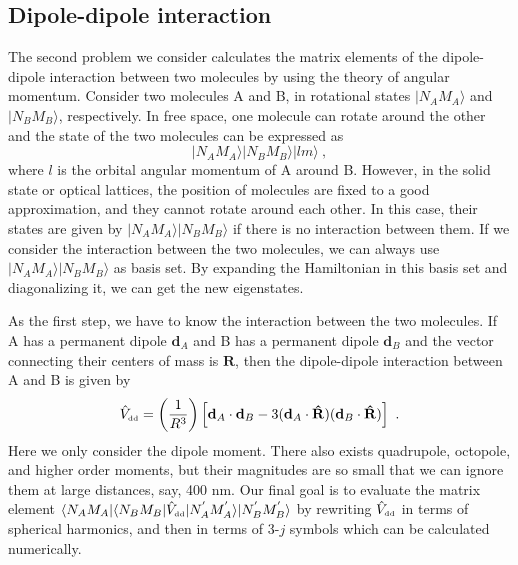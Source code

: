\subsection{Dipole-dipole interaction}
\label{sec::ddInteraction}

The second problem we consider calculates the matrix elements of the dipole-dipole interaction between two molecules by using the theory of angular momentum. 
Consider two molecules A and B, in rotational states $|N_{A}M_{A}\rangle$ and $|N_{B}M_{B}\rangle$, 
respectively. In free space, one molecule can rotate around the other and the state of the two molecules
can be expressed as
\begin{equation}
|N_{A}M_{A}\rangle |N_{B}M_{B}\rangle |lm\rangle  \ , \nonumber
\end{equation}
where $l$ is the orbital angular momentum  of A around B. 
However, in the solid state or optical lattices, the position of molecules are fixed to a good approximation, and they cannot rotate 
around each other. In this case, their states are given by $|N_{A}M_{A}\rangle |N_{B}M_{B}\rangle$ if there is no 
interaction between them. If we consider the interaction between the two molecules, we can always use $|N_{A}M_{A}\rangle |N_{B}M_{B}\rangle$ as basis set. By expanding the Hamiltonian in this basis set and diagonalizing 
it, we can get the new eigenstates.

As the first step, we have to know  the interaction between the two molecules. If A has a permanent dipole  $\mathbf{d}_{A}$ and B has a permanent dipole $\mathbf{d}_{B}$ and the vector connecting their centers of mass is $\mathbf{R}$, then the dipole-dipole interaction between A and B is given by
\begin{equation}
\hat{V}_{\mbox{\tiny dd}} = \left(\frac{1}{R^3}\right)\left[ \mathbf{d}_{A}\cdot\mathbf{d}_{B}-3(\mathbf{d}_{A}\cdot\mathbf{\hat{R}})(\mathbf{d}_{B}\cdot\mathbf{\hat{R}})\right]  \ . \label{dd-operator}
\end{equation}
Here we only consider the dipole moment. There also exists quadrupole, octopole, and higher order moments, but their magnitudes are so small that we can ignore them at large distances, say, 400 nm. Our final goal is to evaluate the matrix element $\langle N_{A}M_{A}|\langle N_{B}M_{B} | \hat{V}_{\mbox{\tiny dd}}|N_{A}^{'}M_{A}^{'}\rangle |N_{B}^{'}M_{B}^{'}  \rangle$ by rewriting $\hat{V}_{\mbox{\tiny dd}}$  in terms of spherical harmonics, and then  in terms of 3-$j$ symbols which can be calculated numerically. 

